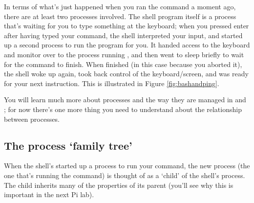In terms of what's just happened when you ran the  command a
moment ago, there are at least two processes involved. The shell
program itself is a process that's waiting for you to type something
at the keyboard; when you pressed enter after having typed your
command, the shell interpreted your input, and started up a second
process to run the  program for you. It handed
access to the keyboard and monitor over to the process running ,
and then  went to sleep briefly to wait for the  command to
finish. When  finished (in this case because you aborted it), the
shell woke up again, took back control of the keyboard/screen, and was
ready for your next instruction. This is illustrated in Figure
\ref{fig:bashandping}.

You will learn much more about processes and the way they are managed in  and ; for now there's one more thing you need to understand about the relationship between processes.

\subsection{The process `family tree'}
\label{section:family-tree}

When the shell's started up a process to run your command, the new process (the one that's running the command) is thought of as a `child' of the shell's process. The child inherits many of the properties of its parent (you'll see why this is important in the next Pi lab).



